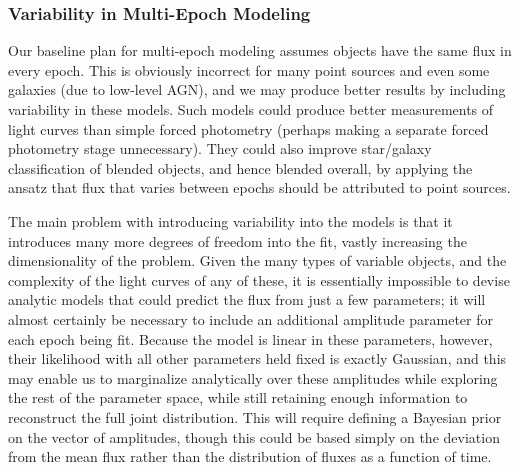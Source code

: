 \documentclass[10pt]{article}
\begin{document}
\subsubsection{Variability in Multi-Epoch Modeling}

\label{sec:variable-models}

Our baseline plan for multi-epoch modeling assumes objects have the same flux
in every epoch.  This is obviously incorrect for many point sources and even
some galaxies (due to low-level AGN), and we may produce better results by
including variability in these models.  Such models could produce better
measurements of light curves than simple forced photometry (perhaps making a
separate forced photometry stage unnecessary). They could also improve
star/galaxy classification of blended objects, and hence blended overall,
by applying the ansatz that flux that varies between epochs should be
attributed to point sources.

The main problem with introducing variability into the models is that it
introduces many more degrees of freedom into the fit, vastly increasing the
dimensionality of the problem.  Given the many types of variable objects, and
the complexity of the light curves of any of these, it is essentially
impossible to devise analytic models that could predict the flux from just a
few parameters; it will almost certainly be necessary to include an additional
amplitude parameter for each epoch being fit.  Because the model is linear in
these parameters, however, their likelihood with all other parameters held
fixed is exactly Gaussian, and this may enable us to marginalize analytically
over these amplitudes while exploring the rest of the parameter space, while
still retaining enough information to reconstruct the full joint distribution.
This will require defining a Bayesian prior on the vector of amplitudes,
though this could be based simply on the deviation from the mean flux rather
than the distribution of fluxes as a function of time.
\end{document}
